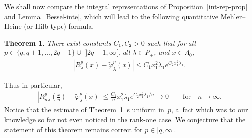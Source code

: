\documentclass[pdftex]{sigma}
\numberwithin{equation}{section}
\newtheorem{Theorem}{Theorem}[section]
\begin{document}
We shall now compare the integral representations of Proposition~\ref{int-rep-prop} and Lemma~\ref{Bessel-inte}, which
will lead to the following quantitative Mehler--Heine (or Hilb-type) formula.

\begin{Theorem}
\label{vgl-Bessel}
There exist constants $C_1,C_2>0$ such that for all $p\in\{q,q+1,\ldots,2q-1\}\cup$ $] 2q-1,\infty[$, all $\lambda\in
P_+$, and $ x\in A_0$,
\begin{gather*}
\left|R_{\lambda}^p(x)-\widetilde\varphi_\lambda^{p} (x)\right|\leq C_1  x_1^2\lambda_1  e^{C_2 x_1^2\lambda_1}.
\end{gather*}
\end{Theorem}
Thus in particular,
\begin{gather*}
\left|R_{n\lambda}^p \left(\frac{x}{n}\right)-\widetilde\varphi_\lambda^{p}(x)\right|\leq \frac{C_1}{n}
x_1^2\lambda_1  e^{C_2 x_1^2\lambda_1/n} \to 0
\qquad
\text{for}
\quad
n\to \infty.
\end{gather*}
Notice that the estimate of Theorem~\ref{vgl-Bessel} is uniform in~$p$, a~fact which was to our knowledge so far not
even noticed in the rank-one case.
We conjecture that the statement of this theorem remains correct for $p\in [q,\infty[$.
\end{document}
